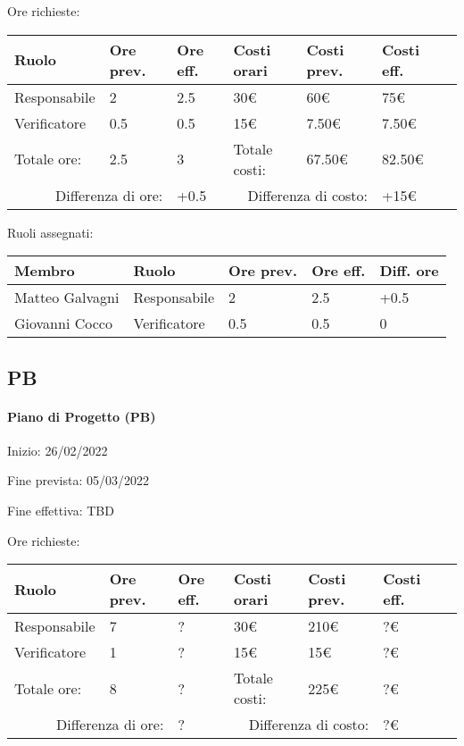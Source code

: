\documentclass[a4paper, 12pt]{article}
\begin{document}
Ore richieste:\\[0.5em]
\begin{tabular}{|l|l|l||l|l|l|l|}\hline
Ruolo & Ore prev. & Ore eff. & Costi orari & Costi prev. & Costi eff.\\\hline
Responsabile & 2 & 2.5 & 30\euro & 60\euro & 75\euro \\\hline
Verificatore & 0.5 & 0.5 & 15\euro & 7.50\euro & 7.50\euro \\\hline
Totale ore: & 2.5 & 3 & Totale costi: & 67.50\euro & 82.50\euro \\\hline
\multicolumn{2}{|r|}{Differenza di ore:} & +0.5 & \multicolumn{2}{r|}{Differenza di costo:} & +15\euro \\\hline
\end{tabular}

Ruoli assegnati:\\[0.5em]
\begin{tabular}{|l|l|l|l|l|}\hline
Membro & Ruolo & Ore prev. & Ore eff. & Diff. ore \\\hline
Matteo Galvagni & Responsabile & 2 & 2.5 & +0.5 \\\hline
Giovanni Cocco & Verificatore & 0.5 & 0.5 & 0 \\\hline
\end{tabular}

\subsection{PB}
\paragraph{Piano di Progetto (PB)}
Inizio: 26/02/2022\par
Fine prevista: 05/03/2022\par
Fine effettiva: TBD

Ore richieste:\\[0.5em]
\begin{tabular}{|l|l|l||l|l|l|l|}\hline
Ruolo & Ore prev. & Ore eff. & Costi orari & Costi prev. & Costi eff.\\\hline
Responsabile & 7 & ? & 30\euro & 210\euro & ?\euro \\\hline
Verificatore & 1 & ? & 15\euro & 15\euro & ?\euro \\\hline
Totale ore: & 8 & ? & Totale costi: & 225\euro & ?\euro \\\hline
\multicolumn{2}{|r|}{Differenza di ore:} & ? & \multicolumn{2}{r|}{Differenza di costo:} & ?\euro \\\hline
\end{tabular}
\end{document}
